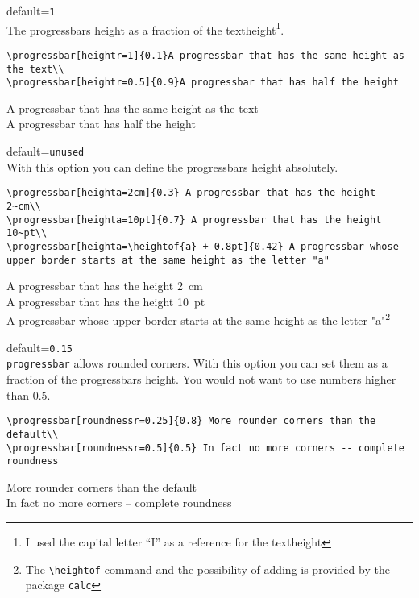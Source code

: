 \documentclass{ltxdoc}
\begin{document}
 default=\texttt{1}\\
	The progressbars height as a fraction of the textheight\footnote{I used the capital letter ``I'' as a reference for the textheight}.
\begin{lstlisting}
\progressbar[heightr=1]{0.1}A progressbar that has the same height as the text\\
\progressbar[heightr=0.5]{0.9}A progressbar that has half the height
\end{lstlisting}
	 A progressbar that has the same height as the text\\
	 A progressbar that has half the height

 default=\texttt{unused}\\
	With this option you can define the progressbars height absolutely.
\begin{lstlisting}
\progressbar[heighta=2cm]{0.3} A progressbar that has the height 2~cm\\
\progressbar[heighta=10pt]{0.7} A progressbar that has the height 10~pt\\
\progressbar[heighta=\heightof{a} + 0.8pt]{0.42} A progressbar whose upper border starts at the same height as the letter "a"
\end{lstlisting}
	 A progressbar that has the height 2~cm\\
	 A progressbar that has the height 10~pt\\
	 A progressbar whose upper border starts at the same height as the letter "a"\footnote{The \texttt{\textbackslash{}heightof} command and the possibility of adding is provided by the package \texttt{calc}}

 default=\texttt{0.15}\\
	\texttt{progressbar} allows rounded corners. With this option you can set them as a fraction of the progressbars height. You would not want to use numbers higher than $0.5$.
\begin{lstlisting}
\progressbar[roundnessr=0.25]{0.8} More rounder corners than the default\\
\progressbar[roundnessr=0.5]{0.5} In fact no more corners -- complete roundness
\end{lstlisting}
	 More rounder corners than the default\\
	 In fact no more corners -- complete roundness
\end{document}
